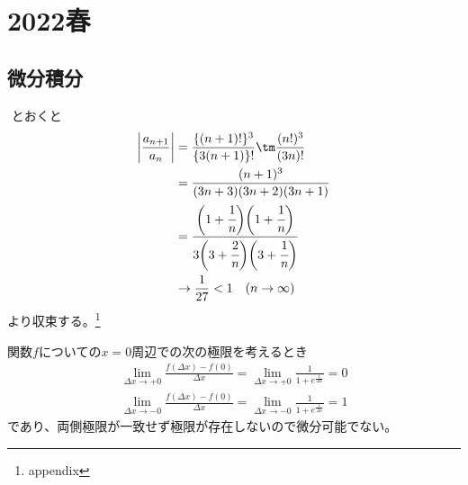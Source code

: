 \section{2022春}

\setcounter{yearcounter}{2022}


\subsection{微分積分}
\begin{ans*}
  ${}$
  とおくと
  \begin{align}
    \left| \frac{a_{n+1}}{a_{n}} \right|
    &= \frac{\{(n+1)!\}^3}{\{3(n+1)\}!} \tm \frac{(n!)^3}{(3n)!} \\
    &= \frac{(n+1)^3}{(3n+3)(3n+2)(3n+1)} \\
    &= \frac{\biggl(1+\cfrac{1}{n}\biggr)\biggl(1+\cfrac{1}{n}\biggr)}
    {3\biggl(3+\cfrac{2}{n}\biggr)\biggl(3+\cfrac{1}{n}\biggr)} \\
    &\to \frac{1}{27} < 1 \quad(n\to\infty)
  \end{align}
  より収束する。\footnote{appendix}
\end{ans*}



\begin{ans*}
  関数$f$についての$x=0$周辺での次の極限を考えるとき
  \begin{align}
    \lim_{\Delta x\to +0}\frac{f(\Delta x) - f(0)}{\Delta x}
    = \lim_{\Delta x\to +0}\frac{1}{1+e^{\frac{1}{\Delta x}}}
    = 0 \\
    \lim_{\Delta x\to -0}\frac{f(\Delta x) - f(0)}{\Delta x}
    = \lim_{\Delta x\to -0}\frac{1}{1+e^{\frac{1}{\Delta x}}}
    = 1
  \end{align}
  であり、両側極限が一致せず極限が存在しないので微分可能でない。
\end{ans*}


